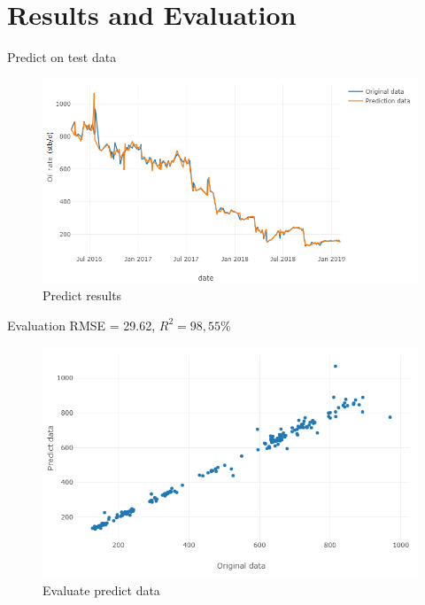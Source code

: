\documentclass[xcolor=table, 11pt]{beamer}
\begin{document}
\section{Results and Evaluation}
\begin{frame}{Predict on test data}
    \begin{figure}
        \centering
        \includegraphics[scale=0.53]{fig/evalua.PNG}
        \caption{Predict results}
        \label{fig:evalua}
    \end{figure}
\end{frame}
\begin{frame}{Evaluation}
RMSE = 29.62, $R^2 = 98,55 \%$
    \begin{figure}
        \centering
        \includegraphics[scale=0.5]{fig/relationship.PNG}
        \caption{Evaluate predict data}
        \label{fig:relationship}
    \end{figure}
\end{frame}
\end{document}
